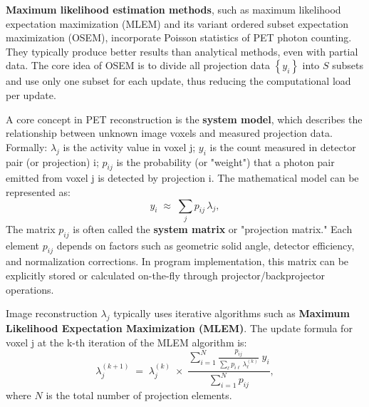 \documentclass[
reprint,
superscriptaddress,
nofootinbib,
amsmath,amssymb,
aps,
prd,
]{revtex4-2}
\begin{document}
\textbf{Maximum likelihood estimation methods}, such as maximum likelihood expectation maximization (MLEM) and its variant ordered subset expectation maximization (OSEM)\cite{363108}, incorporate Poisson statistics of PET photon counting. They typically produce better results than analytical methods, even with partial data.
The core idea of OSEM is to divide all projection data $\left\{y_i\right\}$ into $S$ subsets and use only one subset for each update, thus reducing the computational load per update.

A core concept in PET reconstruction is the \textbf{system model}, which describes the relationship between unknown image voxels and measured projection data. Formally: $\lambda_j$ is the activity value in voxel j; $y_i$ is the count measured in detector pair (or projection) i; $p_{ij}$ is the probability (or "weight") that a photon pair emitted from voxel j is detected by projection i.
The mathematical model can be represented as:
\begin{equation}
    y_i \;\approx\; \sum_{j} p_{ij}\,\lambda_j,
\end{equation}
The matrix $p_{ij}$ is often called the \textbf{system matrix} or "projection matrix." Each element $p_{ij}$ depends on factors such as geometric solid angle, detector efficiency, and normalization corrections. In program implementation, this matrix can be explicitly stored or calculated on-the-fly through projector/backprojector operations.

Image reconstruction $\lambda_j$ typically uses iterative algorithms such as \textbf{Maximum Likelihood Expectation Maximization (MLEM)}. The update formula for voxel j at the k-th iteration of the MLEM algorithm is:
\begin{equation}
    \lambda_j^{(k+1)}
    \;=\;
    \lambda_j^{(k)}
    \;\times\;
    \frac{\displaystyle \sum_{i=1}^{N} \frac{p_{ij}}{\sum_{\ell} p_{i\ell}\,\lambda_{\ell}^{(k)}} \; y_i}
    {\displaystyle \sum_{i=1}^{N} p_{ij}}  ,
\end{equation}
where $N$ is the total number of projection elements.
\end{document}
